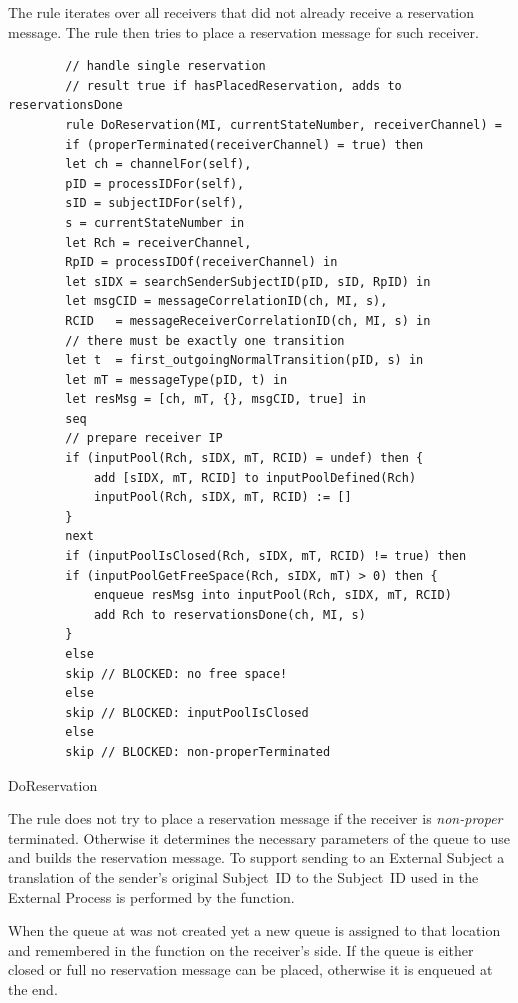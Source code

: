 The  rule iterates over all receivers that did not
already receive a reservation message. The  rule
then tries to place a reservation message for such receiver.

\begin{listing}[H]
	\begin{verbatim}
		// handle single reservation
		// result true if hasPlacedReservation, adds to reservationsDone
		rule DoReservation(MI, currentStateNumber, receiverChannel) =
		if (properTerminated(receiverChannel) = true) then
		let ch = channelFor(self),
		pID = processIDFor(self),
		sID = subjectIDFor(self),
		s = currentStateNumber in
		let Rch = receiverChannel,
		RpID = processIDOf(receiverChannel) in
		let sIDX = searchSenderSubjectID(pID, sID, RpID) in
		let msgCID = messageCorrelationID(ch, MI, s),
		RCID   = messageReceiverCorrelationID(ch, MI, s) in
		// there must be exactly one transition
		let t  = first_outgoingNormalTransition(pID, s) in
		let mT = messageType(pID, t) in
		let resMsg = [ch, mT, {}, msgCID, true] in
		seq
		// prepare receiver IP
		if (inputPool(Rch, sIDX, mT, RCID) = undef) then {
			add [sIDX, mT, RCID] to inputPoolDefined(Rch)
			inputPool(Rch, sIDX, mT, RCID) := []
		}
		next
		if (inputPoolIsClosed(Rch, sIDX, mT, RCID) != true) then
		if (inputPoolGetFreeSpace(Rch, sIDX, mT) > 0) then {
			enqueue resMsg into inputPool(Rch, sIDX, mT, RCID)
			add Rch to reservationsDone(ch, MI, s)
		}
		else
		skip // BLOCKED: no free space!
		else
		skip // BLOCKED: inputPoolIsClosed
		else
		skip // BLOCKED: non-properTerminated
	\end{verbatim}
	\caption{DoReservation}
	\label{lst:shortasm:DoReservation}
\end{listing}


The  rule does not try to place a reservation message
if the receiver is \textit{non-proper} terminated. Otherwise it determines
the necessary parameters of the queue to use and builds the reservation message.
To support sending to an External Subject a translation of the sender's original
Subject~ID to the Subject~ID used in the External Process is performed by the
 function.

When the queue at  was not
created yet a new queue is assigned to that location and remembered in the
 function on the receiver's side.
If the queue is either closed or full no reservation message can be placed,
otherwise it is enqueued at the end.



